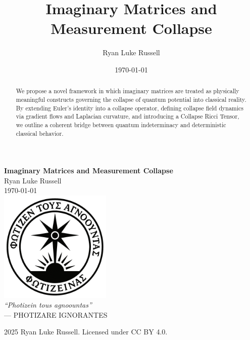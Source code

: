 \documentclass[12pt]{report}
\title{Imaginary Matrices and Measurement Collapse}
\author{Ryan Luke Russell}
\date{\today}
\begin{document}
\pagestyle{fancy}
\fancyhf{}
\lhead{\leftmark}
\rhead{\thepage}
\renewcommand{\headrulewidth}{0.4pt}
\renewcommand{\footrulewidth}{0pt}



\begin{titlepage}
    \centering
    \vspace*{2.5cm}
    {\Huge\bfseries Imaginary Matrices and Measurement Collapse \\[0.5em]}
    {\LARGE Ryan Luke Russell}\\[0.5cm]
    {\large \today}\\[3cm]
    \includegraphics[width=0.4\textwidth]{morningstar.png}\\[1cm]
    {\Large\itshape \textquotedblleft Photizein tous agnoountas\textquotedblright}\\
    {\large --- PHOTIZARE IGNORANTES}
    \vfill
\end{titlepage}

\begin{abstract}
  We propose a novel framework in which imaginary matrices are treated as physically meaningful constructs governing the collapse of quantum potential into classical reality. By extending Euler's identity into a collapse operator, defining collapse field dynamics via gradient flows and Laplacian curvature, and introducing a Collapse Ricci Tensor, we outline a coherent bridge between quantum indeterminacy and deterministic classical behavior.
\end{abstract}
  
\tableofcontents


\vspace{2cm}
\begin{center}
    \textcopyright{}
    2025 Ryan Luke Russell. Licensed under CC BY 4.0.
\end{center}





\end{document}
